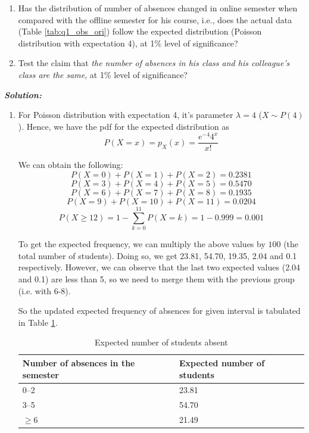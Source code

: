 \documentclass[12pt, oneside]{article}
\begin{document}
\begin{enumerate}
\begin{enumerate}
    \item Has the distribution of number of absences changed in online semester when compared with the offline semester for his course, i.e., does the actual data (Table \ref{tab:q1_obs_ori}) follow the expected distribution (Poisson distribution with expectation 4), at 1\% level of significance?
    \item Test the claim that \textit{the number of absences in his class and his colleague's class are the same}, at 1\% level of significance?
\end{enumerate}

\textit{\textbf{Solution:}} \\
\begin{enumerate}

\item 
For Poisson distribution with expectation 4, it's parameter $\lambda=4$ ($X\sim P(4)$). Hence, we have the pdf for the expected distribution as 
\[ P(X=x) = p_X(x) = \frac{e^{-4} 4^{x}}{x!} \]

We can obtain the following:
\[ P(X = 0) + P(X = 1) + P(X = 2) = 0.2381 \]
\[ P(X = 3) + P(X = 4) + P(X = 5) = 0.5470 \]
\[ P(X = 6) + P(X = 7) + P(X = 8) = 0.1935 \] 
\[ P(X = 9) + P(X = 10) + P(X = 11) = 0.0204 \] 
\[ P(X \ge 12) = 1 - \sum_{k=0}^{11} P(X = k) = 1 - 0.999 = 0.001 \]

To get the expected frequency, we can multiply the above values by $100$ (the total number of students). Doing so, we get 23.81, 54.70, 19.35, 2.04 and 0.1 respectively. However, we can observe that the last two expected values (2.04 and 0.1) are less than 5, so we need to merge them with the previous group (i.e. with 6-8).

So the updated expected frequency of absences for given interval is tabulated in Table \ref{tab:q1_exp_upd_1}.

\begin{table}[h]
    \centering
    \begin{tabular}{l|l}
        \hline
         \textbf{Number of absences in the semester} & \textbf{Expected number of students}  \\
         \hline
            0–2	& 23.81 \\
            3–5 & 54.70 \\
            $\ge$6 & 21.49 \\ 
        \hline
    \end{tabular}
    \caption{Expected number of students absent}
    \label{tab:q1_exp_upd_1}
\end{table}


\end{enumerate}
\end{enumerate}
\end{document}
